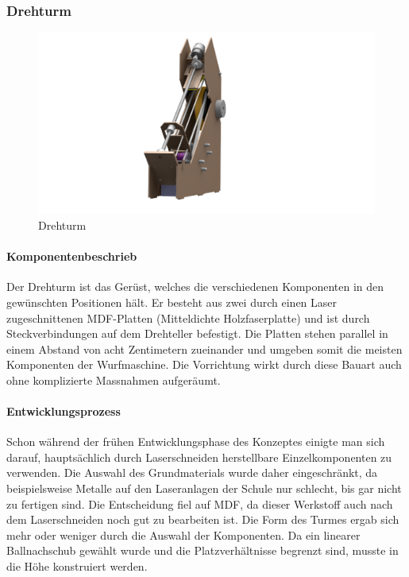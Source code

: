 \subsubsection{Drehturm}
\begin{figure}[h!]
	\centering
	\includegraphics[width=\linewidth]{../../fig/Drehturm}
	\caption{Drehturm}
	\label{fig:Drehturm}
\end{figure}

\paragraph{Komponentenbeschrieb\\}
Der Drehturm ist das Gerüst, welches die verschiedenen Komponenten in den gewünschten Positionen hält. Er besteht aus zwei durch einen Laser zugeschnittenen MDF-Platten (Mitteldichte Holzfaserplatte) und ist durch Steckverbindungen auf dem Drehteller befestigt. Die Platten stehen parallel in einem Abstand von acht Zentimetern zueinander und umgeben somit die meisten Komponenten der Wurfmaschine. Die Vorrichtung wirkt durch diese Bauart auch ohne komplizierte Massnahmen aufgeräumt.

\paragraph{Entwicklungsprozess\\}
Schon während der frühen Entwicklungsphase des Konzeptes einigte man sich darauf, hauptsächlich durch Laserschneiden herstellbare Einzelkomponenten zu verwenden. Die Auswahl des Grundmaterials wurde daher eingeschränkt, da beispielsweise Metalle auf den Laseranlagen der Schule nur schlecht, bis gar nicht zu fertigen sind. Die Entscheidung fiel auf MDF, da dieser Werkstoff auch nach dem Laserschneiden noch gut zu bearbeiten ist. Die Form des Turmes ergab sich mehr oder weniger durch die Auswahl der Komponenten. Da ein linearer Ballnachschub gewählt wurde und die Platzverhältnisse begrenzt sind, musste in die Höhe konstruiert werden.